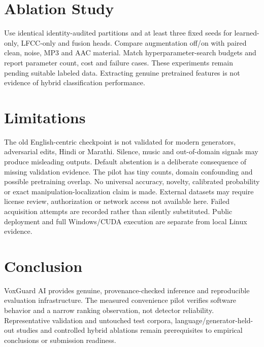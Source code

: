 \IfFileExists{IEEEtran.cls}{\documentclass[conference]{IEEEtran}}{\documentclass[10pt,twocolumn]{article}\usepackage[margin=0.75in]{geometry}}
\begin{document}
\section{Ablation Study}
Use identical identity-audited partitions and at least three fixed seeds for learned-only, LFCC-only and fusion heads. Compare augmentation off/on with paired clean, noise, MP3 and AAC material. Match hyperparameter-search budgets and report parameter count, cost and failure cases. These experiments remain pending suitable labeled data. Extracting genuine pretrained features is not evidence of hybrid classification performance.

\section{Limitations}
The old English-centric checkpoint is not validated for modern generators, adversarial edits, Hindi or Marathi. Silence, music and out-of-domain signals may produce misleading outputs. Default abstention is a deliberate consequence of missing validation evidence. The pilot has tiny counts, domain confounding and possible pretraining overlap. No universal accuracy, novelty, calibrated probability or exact manipulation-localization claim is made. External datasets may require license review, authorization or network access not available here. Failed acquisition attempts are recorded rather than silently substituted. Public deployment and full Windows/CUDA execution are separate from local Linux evidence.

\section{Conclusion}
VoxGuard AI provides genuine, provenance-checked inference and reproducible evaluation infrastructure. The measured convenience pilot verifies software behavior and a narrow ranking observation, not detector reliability. Representative validation and untouched test corpora, language/generator-held-out studies and controlled hybrid ablations remain prerequisites to empirical conclusions or submission readiness.


\end{document}
